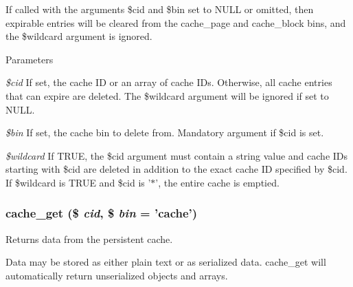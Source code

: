 If called with the arguments \$cid and \$bin set to NULL or omitted, then expirable entries will be cleared from the cache\_\-page and cache\_\-block bins, and the \$wildcard argument is ignored.


\begin{DoxyParams}{Parameters}
\item[{\em \$cid}]If set, the cache ID or an array of cache IDs. Otherwise, all cache entries that can expire are deleted. The \$wildcard argument will be ignored if set to NULL. \item[{\em \$bin}]If set, the cache bin to delete from. Mandatory argument if \$cid is set. \item[{\em \$wildcard}]If TRUE, the \$cid argument must contain a string value and cache IDs starting with \$cid are deleted in addition to the exact cache ID specified by \$cid. If \$wildcard is TRUE and \$cid is '$\ast$', the entire cache is emptied. \end{DoxyParams}
\hypertarget{includes_2cache_8inc_a9d873815c28909b61c3a6188b383f8a3}{
\subsubsection[{cache\_\-get}]{\setlength{\rightskip}{0pt plus 5cm}cache\_\-get (\$ {\em cid}, \/  \$ {\em bin} = {\ttfamily 'cache'})}}
\label{includes_2cache_8inc_a9d873815c28909b61c3a6188b383f8a3}
Returns data from the persistent cache.

Data may be stored as either plain text or as serialized data. cache\_\-get will automatically return unserialized objects and arrays.



